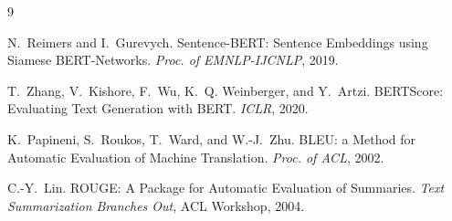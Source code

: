 \documentclass[11pt]{article}
\theoremstyle{definition}
\begin{document}
\begin{thebibliography}{9}

N.~Reimers and I.~Gurevych.
\newblock Sentence-BERT: Sentence Embeddings using Siamese BERT-Networks.
\newblock \emph{Proc. of EMNLP-IJCNLP}, 2019.

T.~Zhang, V.~Kishore, F.~Wu, K.~Q. Weinberger, and Y.~Artzi.
\newblock BERTScore: Evaluating Text Generation with BERT.
\newblock \emph{ICLR}, 2020.

K.~Papineni, S.~Roukos, T.~Ward, and W.-J.~Zhu.
\newblock BLEU: a Method for Automatic Evaluation of Machine Translation.
\newblock \emph{Proc. of ACL}, 2002.

C.-Y.~Lin.
\newblock ROUGE: A Package for Automatic Evaluation of Summaries.
\newblock \emph{Text Summarization Branches Out}, ACL Workshop, 2004.

\end{thebibliography}
\end{document}
